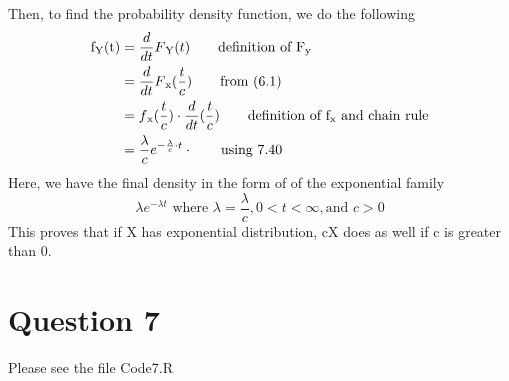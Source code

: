 \documentclass{article}
\numberwithin{equation}{section}
\newcommand{\eqname}[1]{\tag*{#1}}%
\begin{document}
Then, to find the probability density function, we do the following
\begin{align} 
	    \label{f_Y(t)}
		\text{f\textsubscript{Y}(t)} &=  \frac{d}{dt} F\textsubscript{Y}(t) \eqname{definition of F\textsubscript{y}} \\
		&= \frac{d}{dt} F\textsubscript{x}(\frac{t}{c}) \eqname{from (6.1)} \\
		&= f\textsubscript{x}(\frac{t}{c}) \cdot \frac{d}{dt}(\frac{t}{c}) \eqname{definition of f\textsubscript{x} and chain rule} \\
		&= \frac{\lambda}{c} e^{-\frac{\lambda}{c} \cdot t} \cdot \eqname{using 7.40} \\
\end{align}
Here, we have the final density in the form of of the exponential family
\begin{equation}
    \lambda e ^{- \lambda t} \text{ where } \lambda = \frac{\lambda}{c}, 0 < t < \infty,\text{and } c > 0
\end{equation}
This proves that if X has exponential distribution, cX does as well if c is greater than 0.

\section{Question 7}

Please see the file Code7.R
\end{document}
